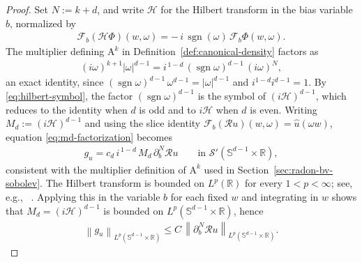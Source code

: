 \documentclass[12pt]{article}
\numberwithin{equation}{section}
\numberwithin{figure}{section}
\numberwithin{equation}{section}
\newcommand{\R}{\mathbb{R}}
\newcommand{\Sph}{\mathbb S}
\newcommand{\norm}[1]{\left\|#1\right\|}
\newcommand{\abs}[1]{\left|#1\right|}
\DeclareMathOperator{\sgn}{sgn}
\begin{document}
\begin{proof}
Set $N:=k+d$, and write $\mathcal H$ for the Hilbert transform in the bias
variable $b$, normalized by
\begin{align}
    \mathcal F_b(\mathcal H\Phi)(w,\omega)
    =-\,i\,\sgn(\omega)\,\mathcal F_b\Phi(w,\omega).
    \label{eq:hilbert-symbol}
\end{align}
The multiplier defining $\mathrm{A}^k $ in Definition~\ref{def:canonical-density}
factors as
\begin{align}
    (i\omega)^{k+1}\abs{\omega}^{d-1}
    =i^{\,1-d}\,(\sgn\omega)^{d-1}\,(i\omega)^N,
    \label{eq:md-factorization}
\end{align}
an exact identity, since $(\sgn\omega)^{d-1}\,\omega^{d-1}=\abs{\omega}^{d-1}$ and
$i^{1-d}i^{d-1}=1$. By \eqref{eq:hilbert-symbol}, the factor $(\sgn\omega)^{d-1}$
is the symbol of $(i\mathcal H)^{d-1}$, which reduces to the identity when $d$ is
odd and to $i\mathcal H$ when $d$ is even. Writing $M_d:=(i\mathcal H)^{d-1}$ and
using the slice identity
$\mathcal F_b(\mathcal Ru)(w,\omega)=\widehat u(\omega w)$, equation
\eqref{eq:md-factorization} becomes
\begin{align*}
    g_u=c_d\,i^{\,1-d}\,M_d\,\partial_b^N\mathcal Ru
    \qquad\text{in }\mathcal S'(\Sph^{d-1}\times\R),
\end{align*}
consistent with the multiplier definition of $\mathrm{A}^k $ used in
Section~\ref{sec:radon-bv-sobolev}. The Hilbert
transform is bounded on $L^p(\R)$ for every $1<p<\infty$; see, e.g.,
~\cite{duoandikoetxea_FourierAnalysis_2000,stein_harmonicanalysis_1993}.
Applying this in the variable $b$ for
each fixed $w$ and integrating in $w$ shows that $M_d=(i\mathcal H)^{d-1}$ is
bounded on $L^p(\Sph^{d-1}\times\R)$, hence
\begin{align}
    \norm{g_u}_{L^p(\Sph^{d-1}\times\R)}
    \le C\,\norm{\partial_b^N\mathcal Ru}_{L^p(\Sph^{d-1}\times\R)} .
    \label{eq:gu-after-multiplier}
\end{align}


\end{proof}
\end{document}
